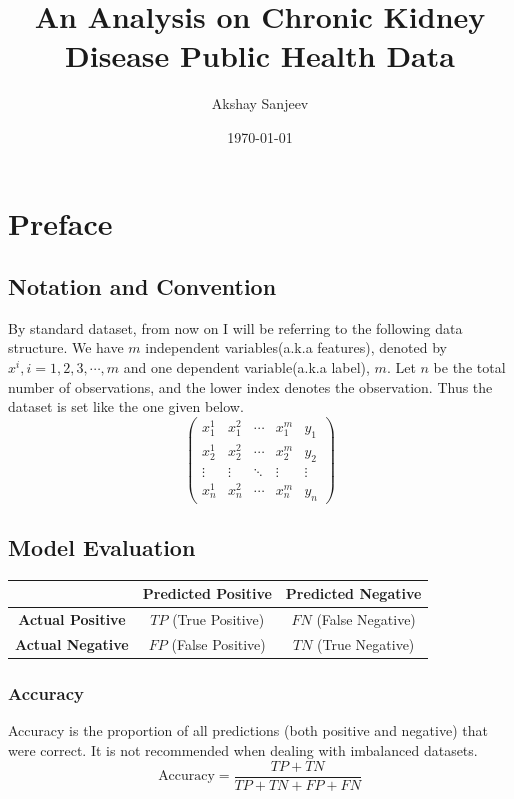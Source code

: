 \documentclass{article}
\title{An Analysis on Chronic Kidney Disease Public Health Data}
\author{Akshay Sanjeev}
\date{\today}
\begin{document}
\maketitle

\section*{Preface}
\subsection{Notation and Convention}
By standard dataset, from now on I will be referring to the following data structure. 
We have $m$ independent variables(a.k.a features), denoted by $x^i, i = 1,2,3, \cdots,m$ 
and one dependent variable(a.k.a label), $m$. Let $n$ be the total number of observations, 
and the lower index denotes the observation. Thus the dataset is set like the one given below. 
\begin{equation}
    \begin{pmatrix}
        x^1_1 & x^2_1 & \cdots & x^m_1 & y_1 \\
        x^1_2 & x^2_2 & \cdots & x^m_2 & y_2 \\
        \vdots & \vdots & \ddots & \vdots & \vdots \\
        x^1_n & x^2_n & \cdots & x^m_n & y_n
    \end{pmatrix}
\end{equation}

\subsection{Model Evaluation}

\begin{center}
\begin{tabular}{|c|c|c|}
\hline
 & \textbf{Predicted Positive} & \textbf{Predicted Negative} \\
\hline
\textbf{Actual Positive} & $TP$ (True Positive) & $FN$ (False Negative) \\
\hline
\textbf{Actual Negative} & $FP$ (False Positive) & $TN$ (True Negative) \\
\hline
\end{tabular}
\end{center}

\subsubsection*{Accuracy}
Accuracy is the proportion of all predictions (both positive and negative) that were correct. It is not recommended when dealing with imbalanced datasets.
\[
\text{Accuracy} = \frac{TP + TN}{TP + TN + FP + FN}
\]
\end{document}
